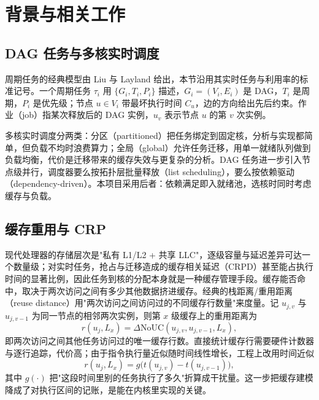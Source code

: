 
\section{背景与相关工作} \label{sec:realtime}

\subsection{DAG 任务与多核实时调度}

周期任务的经典模型由 Liu 与 Layland 给出\cite{ref1}，本节沿用其实时任务与利用率的标准记号\cite{ref8}。一个周期任务 $\tau_i$ 用 $\{G_i,T_i,P_i\}$ 描述，$G_i=(V_i,E_i)$ 是 DAG，$T_i$ 是周期，$P_i$ 是优先级；节点 $u\in V_i$ 带最坏执行时间 $C_u$，边的方向给出先后约束。作业（job）指某次释放后的 DAG 实例，$u_v$ 表示节点 $u$ 的第 $v$ 次实例。

多核实时调度分两类：分区（partitioned）把任务绑定到固定核，分析与实现都简单，但负载不均时浪费算力；全局（global）允许任务迁移，用单一就绪队列做到负载均衡，代价是迁移带来的缓存失效与更复杂的分析\cite{ref2}。DAG 任务进一步引入节点级并行，调度器要么按拓扑层批量释放（list scheduling），要么按依赖驱动（dependency-driven）。本项目采用后者：依赖满足即入就绪池，选核时同时考虑缓存与负载。

\subsection{缓存重用与 CRP}

现代处理器的存储层次是"私有 L1/L2 + 共享 LLC"\cite{ref5}，逐级容量与延迟差异可达一个数量级\cite{ref10}；对实时任务，抢占与迁移造成的缓存相关延迟（CRPD）甚至能占执行时间的显著比例\cite{ref3}，因此任务到核的分配本身就是一种缓存管理手段\cite{ref4}。缓存能否命中，取决于两次访问之间有多少其他数据挤进缓存。经典的栈距离/重用距离（reuse distance）用"两次访问之间访问过的不同缓存行数量"来度量\cite{ref6}。记 $u_{j,v}$ 与 $u_{j,v-1}$ 为同一节点的相邻两次实例，则第 $x$ 级缓存上的重用距离为
\begin{equation}
r(u_j,L_x)=\Delta \mathrm{NoUC}(u_{j,v},u_{j,v-1},L_x),
\end{equation}
即两次访问之间其他任务访问过的唯一缓存行数。直接统计缓存行需要硬件计数器与逐行追踪，代价高；由于指令执行量近似随时间线性增长，工程上改用时间近似
\begin{equation}
r(u_j,L_x)=g\big(t(u_{j,v})-t(u_{j,v-1})\big),
\end{equation}
其中 $g(\cdot)$ 把"这段时间里别的任务执行了多久"折算成干扰量。这一步把缓存建模降成了对执行区间的记账，是能在内核里实现的关键。

